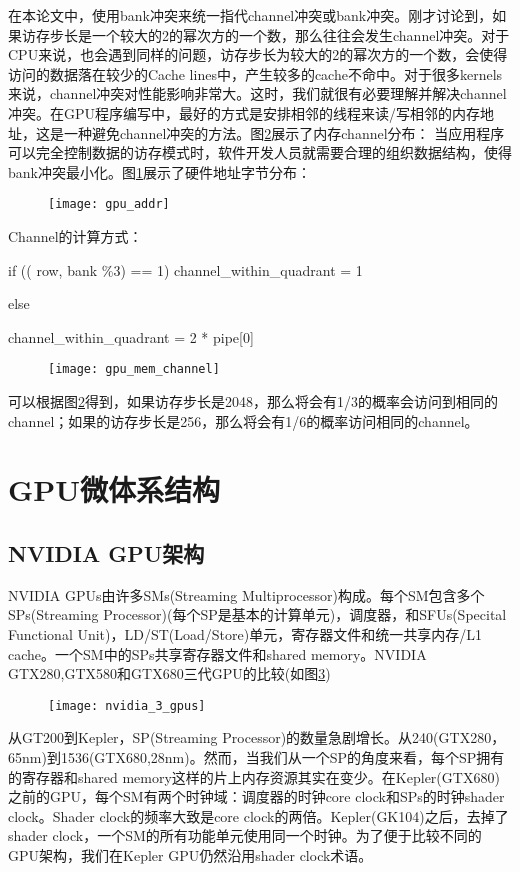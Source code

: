 在本论文中，使用bank冲突来统一指代channel冲突或bank冲突。刚才讨论到，如果访存步长是一个较大的2的幂次方的一个数，那么往往会发生channel冲突。对于CPU来说，也会遇到同样的问题，访存步长为较大的2的幂次方的一个数，会使得访问的数据落在较少的Cache lines中，产生较多的cache不命中。对于很多kernels来说，channel冲突对性能影响非常大。这时，我们就很有必要理解并解决channel冲突。在GPU程序编写中，最好的方式是安排相邻的线程来读/写相邻的内存地址，这是一种避免channel冲突的方法。图\ref{fig:gpu_mem_channel}展示了内存channel分布：
当应用程序可以完全控制数据的访存模式时，软件开发人员就需要合理的组织数据结构，使得bank冲突最小化。图\ref{fig:gpu_addr}展示了硬件地址字节分布：

\begin{figure}[htbp]
	\centering
	\texttt{[image: gpu\_addr]}
	\label{fig:gpu_addr}
\end{figure}
Channel的计算方式：

if (({ row, bank} \%3) == 1)
channel\_within\_quadrant = 1

else

channel\_within\_quadrant = 2 * pipe[0]

\begin{figure}[htbp]
	\centering
	\texttt{[image: gpu\_mem\_channel]}
	\label{fig:gpu_mem_channel}
\end{figure}

可以根据图\ref{fig:gpu_mem_channel}得到，如果访存步长是2048，那么将会有1/3的概率会访问到相同的channel；如果的访存步长是256，那么将会有1/6的概率访问相同的channel。

\section{GPU微体系结构}
\subsection{NVIDIA GPU架构}
NVIDIA GPUs由许多SMs(Streaming Multiprocessor)构成。每个SM包含多个SPs(Streaming Processor)(每个SP是基本的计算单元)，调度器，和SFUs(Specital Functional Unit)，LD/ST(Load/Store)单元，寄存器文件和统一共享内存/L1 cache。一个SM中的SPs共享寄存器文件和shared memory。NVIDIA GTX280,GTX580和GTX680三代GPU的比较(如图\ref{fig:nvidia_3_gpus})
\begin{figure}[htbp]
	\centering
	\texttt{[image: nvidia\_3\_gpus]}
	\label{fig:nvidia_3_gpus}
\end{figure}
从GT200到Kepler，SP(Streaming Processor)的数量急剧增长。从240(GTX280，65nm)到1536(GTX680,28nm)。然而，当我们从一个SP的角度来看，每个SP拥有的寄存器和shared memory这样的片上内存资源其实在变少。在Kepler(GTX680)之前的GPU，每个SM有两个时钟域：调度器的时钟core clock和SPs的时钟shader clock。Shader clock的频率大致是core clock的两倍。Kepler(GK104)之后，去掉了shader clock，一个SM的所有功能单元使用同一个时钟。为了便于比较不同的GPU架构，我们在Kepler GPU仍然沿用shader clock术语。


